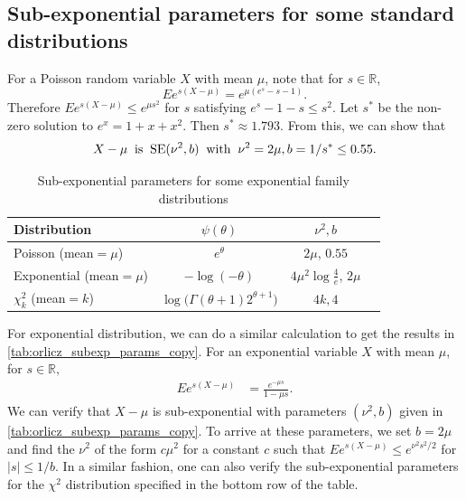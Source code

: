 \documentclass[ejs,noshowframe]{imsart}
\theoremstyle{plain}
\theoremstyle{definition}
\newcommand{\R}{\mathbb{R}}
\newcommand{\E}{E}
\begin{document}
\begin{appendix}
\subsection{Sub-exponential parameters for some standard distributions}

For a Poisson random variable $X$ with mean $\mu$, note that for $s\in \R$,
\begin{equation*}
\E e^{s(X-\mu)} = e^{\mu(e^s-s-1)}.
\end{equation*}
Therefore $ \E e^{s(X-\mu)} \leq e^{\mu s^2}$ for $s$ satisfying $e^s- 1 - s 
\leq  s^2$. Let $s^*$ be the  non-zero solution to $e^x = 1+x+x^2$. Then 
$s^*\approx 1.793$.
From this, we can show that
$$
X-\mu \;\;{\rm is}\;\; {\rm SE}(\nu^2, b) \;\;{\rm with }\;\;  \nu^2=2\mu, 
b=1/s^* \leq 0.55.
$$


\begin{table}[t]
    \caption{\label{tab:orlicz_subexp_params_copy} Sub-exponential parameters 
		for some exponential family distributions}
  \centering
  \begin{tabular}{lccc}
    \toprule
    Distribution & $\psi(\theta)$ 
    & $\nu^2, b$\\
    \midrule
    Poisson (mean$=\mu$) & $e^\theta$ 
    & $2\mu$, \; $0.55$ \\ 
    Exponential (mean$=\mu$) & $-\log(-\theta)$ 
    & $4\mu^2\log\frac{4}{e} $,\; $2\mu$ \\
    $\chi^2_k$ (mean$=k$) & $\log \big(\Gamma(\theta+1) 2^{\theta+1}\big)$ 
     & $4k, 4$ \\
\bottomrule
\end{tabular}
\end{table}

For exponential distribution, we can do a similar calculation to get the results
in \autoref{tab:orlicz_subexp_params_copy}.
For an exponential variable $X$ with mean $\mu$, for $s\in \R,$
\begin{align}
\E e^{s (X-\mu)} &=  \frac{e^{-\mu s}}{1-\mu s}.
\end{align}
We can verify 
that $X-\mu$ is sub-exponential with parameters $(\nu^2,b)$ given in 
\autoref{tab:orlicz_subexp_params_copy}. To arrive at these parameters, we set 
$b=2\mu$ and find the $\nu^2$ of
the form $c\mu^2$ for a constant $c$ such that $\E e^{s(X-\mu)} \leq e^{\nu^2 
s^2/2}$ for $|s| \leq 1/b$.
In a similar fashion, one can also verify the sub-exponential 
parameters for the $\chi^2$ distribution specified in the bottom row of the 
table.


\end{appendix}
\end{document}
